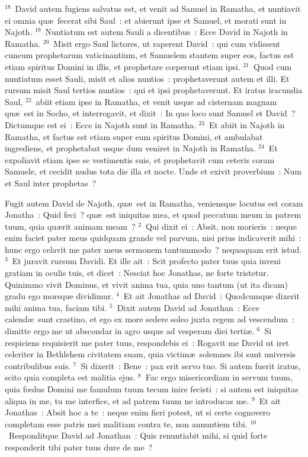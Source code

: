 ${}^{18}$~David autem fugiens salvatus est, et venit ad Samuel in Ramatha, et nuntiavit ei omnia qu\ae\ fecerat sibi Saul~: et abierunt ipse et Samuel, et morati sunt in Najoth.
${}^{19}$~Nuntiatum est autem Sauli a dicentibus~: Ecce David in Najoth in Ramatha.
${}^{20}$~Misit ergo Saul lictores, ut raperent David~: qui cum vidissent cuneum prophetarum vaticinantium, et Samuelem stantem super eos, factus est etiam spiritus Domini in illis, et prophetare cœperunt etiam ipsi.
${}^{21}$~Quod cum nuntiatum esset Sauli, misit et alios nuntios~: prophetaverunt autem et illi. Et rursum misit Saul tertios nuntios~: qui et ipsi prophetaverunt. Et iratus iracundia Saul,
${}^{22}$~abiit etiam ipse in Ramatha, et venit usque ad cisternam magnam qu\ae\ est in Socho, et interrogavit, et dixit~: In quo loco sunt Samuel et David~? Dictumque est ei~: Ecce in Najoth sunt in Ramatha.
${}^{23}$~Et abiit in Najoth in Ramatha, et factus est etiam super eum spiritus Domini, et ambulabat ingrediens, et prophetabat usque dum veniret in Najoth in Ramatha.
${}^{24}$~Et expoliavit etiam ipse se vestimentis suis, et prophetavit cum ceteris coram Samuele, et cecidit nudus tota die illa et nocte. Unde et exivit proverbium~: Num et Saul inter prophetas~?

\lettrine[lines=10,image=true,loversize=0.05,lraise=-0.03]{F}{}ugit autem David de Najoth, qu\ae\ est in Ramatha, veniensque locutus est coram Jonatha~: Quid feci~? qu\ae\ est iniquitas mea, et quod peccatum meum in patrem tuum, quia qu\ae rit animam meam~?
${}^{2}$~Qui dixit ei~: Absit, non morieris~: neque enim faciet pater meus quidquam grande vel parvum, nisi prius indicaverit mihi~: hunc ergo celavit me pater meus sermonem tantummodo~? nequaquam erit istud.
${}^{3}$~Et juravit rursum Davidi. Et ille ait~: Scit profecto pater tuus quia inveni gratiam in oculis tuis, et dicet~: Nesciat hoc Jonathas, ne forte tristetur. Quinimmo vivit Dominus, et vivit anima tua, quia uno tantum (ut ita dicam) gradu ego morsque dividimur.
${}^{4}$~Et ait Jonathas ad David~: Quodcumque dixerit mihi anima tua, faciam tibi.
${}^{5}$~Dixit autem David ad Jonathan~: Ecce calend\ae\ sunt crastino, et ego ex more sedere soleo juxta regem ad vescendum~: dimitte ergo me ut abscondar in agro usque ad vesperam diei terti\ae .
${}^{6}$~Si respiciens requisierit me pater tuus, respondebis ei~: Rogavit me David ut iret celeriter in Bethlehem civitatem suam, quia victim\ae\ solemnes ibi sunt universis contribulibus suis.
${}^{7}$~Si dixerit~: Bene~: pax erit servo tuo. Si autem fuerit iratus, scito quia completa est malitia ejus.
${}^{8}$~Fac ergo misericordiam in servum tuum, quia fœdus Domini me famulum tuum tecum inire fecisti~: si autem est iniquitas aliqua in me, tu me interfice, et ad patrem tuum ne introducas me.
${}^{9}$~Et ait Jonathas~: Absit hoc a te~: neque enim fieri potest, ut si certe cognovero completam esse patris mei malitiam contra te, non annuntiem tibi.
${}^{10}$~Responditque David ad Jonathan~: Quis renuntiabit mihi, si quid forte responderit tibi pater tuus dure de me~?


